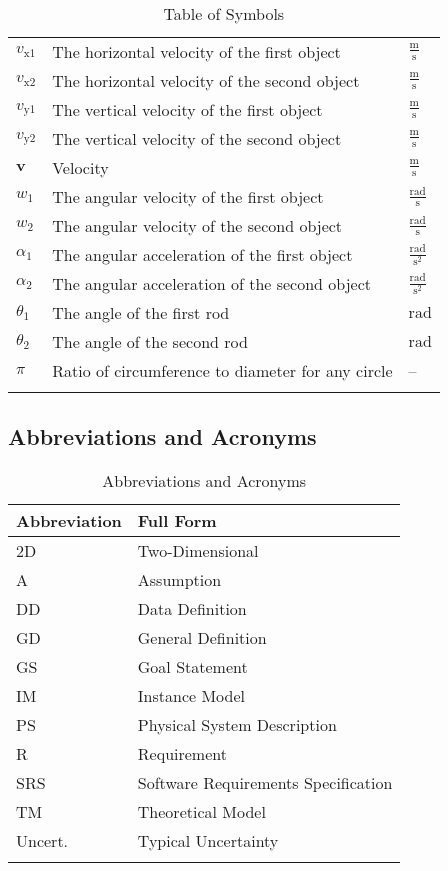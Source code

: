 \documentclass[12pt]{article}
\begin{document}
\begin{longtable}{l l l}
\\
${v_{\text{x}1}}$ & The horizontal velocity of the first object & $\frac{\text{m}}{\text{s}}$
\\
${v_{\text{x}2}}$ & The horizontal velocity of the second object & $\frac{\text{m}}{\text{s}}$
\\
${v_{\text{y}1}}$ & The vertical velocity of the first object & $\frac{\text{m}}{\text{s}}$
\\
${v_{\text{y}2}}$ & The vertical velocity of the second object & $\frac{\text{m}}{\text{s}}$
\\
$\symbf{v}$ & Velocity & $\frac{\text{m}}{\text{s}}$
\\
${w_{1}}$ & The angular velocity of the first object & $\frac{\text{rad}}{\text{s}}$
\\
${w_{2}}$ & The angular velocity of the second object & $\frac{\text{rad}}{\text{s}}$
\\
${α_{1}}$ & The angular acceleration of the first object & $\frac{\text{rad}}{\text{s}^{2}}$
\\
${α_{2}}$ & The angular acceleration of the second object & $\frac{\text{rad}}{\text{s}^{2}}$
\\
${θ_{1}}$ & The angle of the first rod & ${\text{rad}}$
\\
${θ_{2}}$ & The angle of the second rod & ${\text{rad}}$
\\
$π$ & Ratio of circumference to diameter for any circle & --
\\
\bottomrule
\caption{Table of Symbols}
\label{Table:ToS}
\end{longtable}
\subsection{Abbreviations and Acronyms}
\label{Sec:TAbbAcc}
\begin{longtable}{l l}
\toprule
\textbf{Abbreviation} & \textbf{Full Form}
\\
\midrule
\endhead
2D & Two-Dimensional
\\
A & Assumption
\\
DD & Data Definition
\\
GD & General Definition
\\
GS & Goal Statement
\\
IM & Instance Model
\\
PS & Physical System Description
\\
R & Requirement
\\
SRS & Software Requirements Specification
\\
TM & Theoretical Model
\\
Uncert. & Typical Uncertainty
\\
\bottomrule
\caption{Abbreviations and Acronyms}
\label{Table:TAbbAcc}
\end{longtable}
\end{document}
